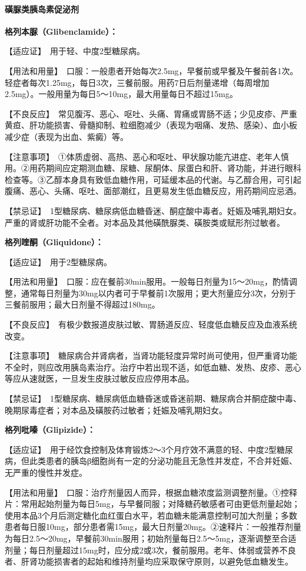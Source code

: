 \paragraph{磺脲类胰岛素促泌剂}

\textbf{格列本脲（Glibenclamide）：}

【适应证】　用于轻、中度2型糖尿病。

【用法和用量】　口服：一般患者开始每次2.5mg，早餐前或早餐及午餐前各1次。轻症者每次1.25mg，每日3次，三餐前服。用药7日后剂量递增（每周增加2.5mg）。一般用量为每日5～10mg，最大用量每日不超过15mg。

【不良反应】　常见腹泻、恶心、呕吐、头痛、胃痛或胃肠不适；少见皮疹、严重黄疸、肝功能损害、骨髓抑制、粒细胞减少（表现为咽痛、发热、感染）、血小板减少症（表现为出血、紫癜）等。

【注意事项】　①体质虚弱、高热、恶心和呕吐、甲状腺功能亢进症、老年人慎用。②用药期间应定期测血糖、尿糖、尿酮体、尿蛋白和肝、肾功能，并进行眼科检查等。③乙醇本身具有致低血糖作用，可延缓本品的代谢。与乙醇合用，可引起腹痛、恶心、头痛、呕吐、面部潮红，且更易发生低血糖反应，用药期间应忌酒。

【禁忌证】　1型糖尿病、糖尿病低血糖昏迷、酮症酸中毒者。妊娠及哺乳期妇女。严重的肾或肝功能不全者。对本品及其他磺酰脲类、磺胺类或赋形剂过敏者。

\textbf{格列喹酮（Gliquidone）：}

【适应证】　用于2型糖尿病。

【用法和用量】　口服：应在餐前30min服用。一般每日剂量为15～20mg，酌情调整，通常每日剂量为30mg以内者可于早餐前1次服用；更大剂量应分3次，分别于三餐前服用；最大日剂量不得超过180mg。

【不良反应】　有极少数报道皮肤过敏、胃肠道反应、轻度低血糖反应及血液系统改变。

【注意事项】　糖尿病合并肾病者，当肾功能轻度异常时尚可使用，但严重肾功能不全时，则应改用胰岛素治疗。治疗中若出现不适，如低血糖、发热、皮疹、恶心等应从速就医，一旦发生皮肤过敏反应应停用本品。

【禁忌证】　1型糖尿病、糖尿病低血糖昏迷或昏迷前期、糖尿病合并酮症酸中毒、晚期尿毒症者；对本品及磺胺药过敏者；妊娠及哺乳期妇女。

\textbf{格列吡嗪（Glipizide）：}

【适应证】　用于经饮食控制及体育锻炼2～3个月疗效不满意的轻、中度2型糖尿病，但此类患者的胰岛β细胞尚有一定的分泌功能且无急性并发症，不合并妊娠、无严重的慢性并发症。

【用法和用量】　口服：治疗剂量因人而异，根据血糖浓度监测调整剂量。①控释片：常用起始剂量为每日5mg，与早餐同服；对降糖药敏感者可由更低剂量起始；使用本品3个月后测定糖化血红蛋白水平，若血糖未能满意控制可加大剂量；多数患者每日服10mg，部分患者需15mg，最大日剂量20mg。②速释片：一般推荐剂量为每日2.5～20mg，早餐前30min服用；初始剂量每日2.5～5mg，逐渐调整至合适剂量；每日剂量超过15mg时，应分成2或3次，餐前服用。老年、体弱或营养不良者、肝肾功能损害者的起始和维持剂量均应采取保守原则，以避免低血糖发生。

